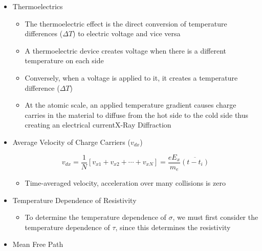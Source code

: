 \begin{itemize}

  \item Thermoelectrics

    \begin{itemize}

      \item The thermoelectric effect is the direct conversion of temperature differences ($\Delta T$) to electric voltage and vice versa

      \item A thermoelectric device creates voltage when there is a different temperature on each side

      \item Conversely, when a voltage is applied to it, it creates a temperature difference ($\Delta T$)

      \item At the atomic scale, an applied temperature gradient causes charge carries in the material to diffuse from the hot side to the cold side thus creating an electrical currentX-Ray Diffraction

    \end{itemize}

  \item Average Velocity of Charge Carriers ($v_{dx}$)

    $$v_{dx}=\frac{1}{N}[v_{x1}+v_{x2}+\cdots+v_{xN}]=\frac{eE_x}{m_e}\overline{(t-t_i)}$$

    \begin{itemize}

      \item Time-averaged velocity, acceleration over many collisions is zero

    \end{itemize}

  \item Temperature Dependence of Resistivity

    \begin{itemize}

      \item To determine the temperature dependence of $\sigma$, we must first consider the temperature dependence of $\tau$, since this determines the resistivity

    \end{itemize}

  \item Mean Free Path

    \begin{itemize}


\end{itemize}
\end{itemize}
